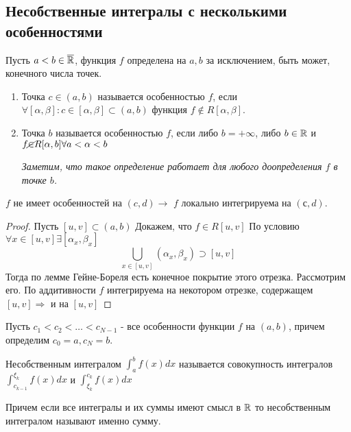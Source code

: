 \subsection{Несобственные интегралы с несколькими особенностями}
\begin{definition}
    Пусть \(a < b \in \overline{\mathbb{R}}\), функция \(f\) определена на \(a, b\) за исключением, быть может, конечного числа точек. 
    \begin{enumerate}
        \item Точка \(c \in (a, b)\) называется особенностью \(f\), если \(\forall [\alpha, \beta]: c \in [\alpha, \beta] \subset (a, b)\) функция \(f \notin R[\alpha, \beta]\). 
        
        \item Точка \(b\) называется особенностью \(f\), если либо $b = +\infty$, либо $b \in \mathbb{R}$ и $f \cancel{\in} R[\alpha, b] \forall a < \alpha < b$

        \textit{Заметим, что такое определение работает для любого доопределения $f$ в точке $b$.}
    \end{enumerate}
\end{definition}
    \begin{note}
        $f$ не имеет особенностей на $(c, d) \rightarrow$ $f$ локально интегрируема на $(с, d)$.
    \end{note}
    \begin{proof}
        Пусть $[u,v] \subset (a,b)$
        Докажем, что $f \in R [u,v]$
        По условию $\forall x \in [u,v] \exists [\alpha_x,\beta_x]$
        $$\bigcup_{x \in [u, v]}(\alpha_x, \beta_x) \supset [u, v]$$
        Тогда по лемме Гейне-Бореля есть конечное покрытие этого отрезка. 
        Рассмотрим его.
        По аддитивности $f$ интегрируема на некотором отрезке, содержащем $[u, v] \Rightarrow$ и на $[u, v]$
    \end{proof}
    \begin{definition}
        Пусть $c_1 < c_2 < \dots < c_{N-1} $ - все особенности функции $f$ на $(a, b)$, причем определим \(c_0 = a, c_N = b\).

    \end{definition}

    Несобственным интегралом $\int_{a}^b f(x) dx$ называется совокупность интегралов $\int_{c_{k-1}}^{\xi_k}f(x)dx$ и $\int_{\xi_k}^{c_k} f(x)dx$

    Причем если все интегралы и их суммы имеют смысл в $\mathbb{R}$ то несобственным интегралом называют именно сумму.
        
    
        
